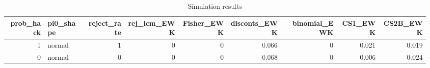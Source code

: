 \begin{table}

\caption{Simulation results}
\centering
\begin{tabular}[t]{rlrrrrrrr}
\toprule
prob_hack & pi0_shape & reject_rate & rej_lcm_EWK & Fisher_EWK & disconts_EWK & binomial_EWK & CS1_EWK & CS2B_EWK\\
\midrule
1 & normal & 1 & 0 & 0 & 0.066 & 0 & 0.021 & 0.019\\
0 & normal & 0 & 0 & 0 & 0.068 & 0 & 0.006 & 0.024\\
\bottomrule
\end{tabular}
\end{table}
